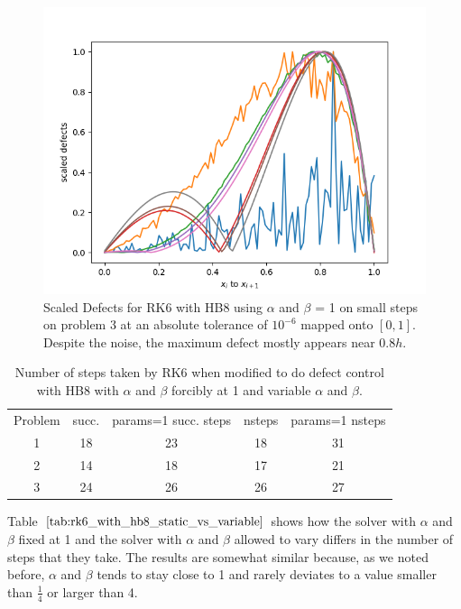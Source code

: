\begin{figure}[H]
\centering
\includegraphics[width=0.7\linewidth]{./figures/static_alpha_rk6_with_hb8_p3_scaled_defects_small_steps}
\caption{Scaled Defects for RK6 with HB8 using $\alpha$ and $\beta$ = 1 on small steps on problem 3 at an absolute tolerance of $10^{-6}$ mapped onto $[0, 1]$. Despite the noise, the maximum defect mostly appears near $0.8h$.}
\label{fig:static_alpha_rk6_with_hb8_p3_scaled_defects_small_steps}
\end{figure}

\begin{table}[h]
\caption {Number of steps taken by RK6 when modified to do defect control with HB8 with $\alpha$ and $\beta$ forcibly at 1 and variable $\alpha$ and $\beta$.} \label{tab:rk6_with_hb8_static_vs_variable}
\begin{center}
\begin{tabular}{ c c c c c } 
Problem & succ. & params=1 succ. steps & nsteps & params=1 nsteps \\ 
1       & 18                      &        23               & 18         & 31\\ 
2       & 14                      &        18               & 17         & 21\\
3       & 24                      &        26               & 26         & 27\\
\end{tabular}
\end{center}
\end{table}	

Table $\ref{tab:rk6_with_hb8_static_vs_variable}$ shows how the solver with $\alpha$ and $\beta$ fixed at 1 and the solver with $\alpha$ and $\beta$ allowed to vary differs in the number of steps that they take. The results are somewhat similar because, as we noted before, $\alpha$ and $\beta$ tends to stay close to 1 and rarely deviates to a value smaller than $\frac{1}{4}$ or larger than 4.